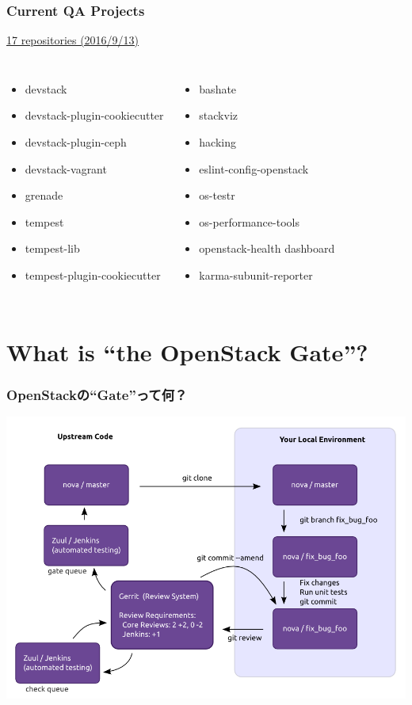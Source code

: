 \documentclass[aspectratio=169,11pt,hyperref={colorlinks=true}]{beamer}
\begin{document}
\begin{frame}
  \frametitle{Current QA Projects}
  \href{http://governance.openstack.org/reference/projects/quality-assurance.html}{17 repositories (2016/9/13)}
  \begin{columns}
      \begin{itemize}
          \item{devstack}
          \item{devstack-plugin-cookiecutter}
          \item{devstack-plugin-ceph}
          \item{devstack-vagrant}
          \item{grenade}
          \item{tempest}
          \item{tempest-lib}
          \item{tempest-plugin-cookiecutter}
      \end{itemize}
      \begin{itemize}
          \item{bashate}
          \item{stackviz}
          \item{hacking}
          \item{eslint-config-openstack}
          \item{os-testr}
          \item{os-performance-tools}
          \item{openstack-health dashboard}
          \item{karma-subunit-reporter}
      \end{itemize}
  \end{columns}
\end{frame}

\section{What is ``the OpenStack Gate''?}
\begin{frame}
  \frametitle{OpenStackの``Gate''って何？}
  \begin{center}
    \includegraphics[width=.65\textwidth]{code_review.png}
  \end{center}
\end{frame}
\end{document}
